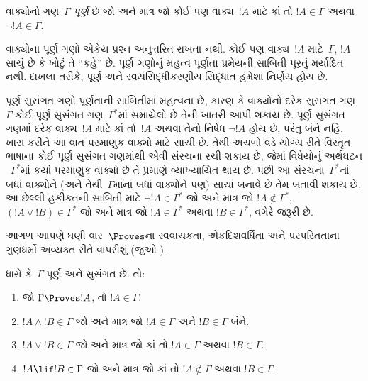 \begingroup
\makeatletter{}\makeatother


\label{guunit:OLP-0129}


\begin{defn}[પૂર્ણ ગણ]
 વાક્યોનો ગણ~$\Gamma$ \emph{પૂર્ણ}
છે જો અને માત્ર જો કોઈ પણ વાક્ય~$!A$ માટે કાં તો $!A \in
\Gamma$ અથવા $\lnot !A \in \Gamma$.
\end{defn}

\begin{explain}
વાક્યોના પૂર્ણ ગણો એકેય પ્રશ્ન અનુત્તરિત રાખતા નથી. કોઈ
પણ વાક્ય~$!A$ માટે~$\Gamma$, $!A$ સાચું છે કે ખોટું તે ``કહે''
છે. પૂર્ણ ગણોનું મહત્વ પૂર્ણતા પ્રમેયની સાબિતી પૂરતું મર્યાદિત
નથી. દાખલા તરીકે, પૂર્ણ અને સ્વયંસિદ્ધીકરણીય સિદ્ધાંત હંમેશાં
નિર્ણેય હોય છે.
\end{explain}

\begin{explain}
પૂર્ણ સુસંગત ગણો પૂર્ણતાની સાબિતીમાં મહત્વના છે, કારણ કે
વાક્યોનો દરેક સુસંગત ગણ~$\Gamma$ કોઈ પૂર્ણ સુસંગત
ગણ~$\Gamma^*$માં સમાયેલો છે તેની ખાતરી આપી શકાય છે. પૂર્ણ
સુસંગત ગણમાં દરેક વાક્ય~$!A$ માટે કાં તો~$!A$ અથવા તેનો નિષેધ
$\lnot !A$ હોય છે, પરંતુ બંને નહિ. ખાસ કરીને આ વાત
પરમાણુક વાક્યો માટે સાચી છે. તેથી
અચળો વડે યોગ્ય રીતે વિસ્તૃત ભાષાના કોઈ
પૂર્ણ સુસંગત ગણમાંથી એવી
સંરચના રચી શકાય છે, જેમાં
વિધેયોનું અર્થઘટન
~$\Gamma^*$માં કયાં પરમાણુક વાક્યો
છે તે પ્રમાણે વ્યાખ્યાયિત થાય છે. પછી આ
સંરચના~$\Gamma^*$નાં બધાં
વાક્યોને (અને તેથી~$\Gamma$માંનાં બધાં વાક્યોને પણ) સાચાં બનાવે
છે તેમ બતાવી શકાય છે. આ છેલ્લી હકીકતની સાબિતી માટે $\lnot !A \in
\Gamma^*$ જો અને માત્ર જો $!A \notin \Gamma^*$, $(!A \lor !B) \in
\Gamma^*$ જો અને માત્ર જો $!A \in \Gamma^*$ અથવા $!B \in \Gamma^*$,
વગેરે જરૂરી છે.
\end{explain}

આગળ આપણે ઘણી વાર~$\Proves$ના સ્વવાચકતા, એકદિશવર્ધિતા અને પરંપરિતતાના
ગુણધર્મો અવ્યક્ત રીતે વાપરીશું (જુઓ
%
  ).

\begin{prop}
ધારો કે~$\Gamma$ પૂર્ણ અને સુસંગત છે. તો:
\begin{enumerate}
\item {} જો $\Gamma \Proves !A$, તો $!A \in
  \Gamma$.

\item {} $!A \land !B \in \Gamma$
  જો અને માત્ર જો $!A \in \Gamma$ અને $!B \in \Gamma$ બંને.

\item {} $!A \lor !B \in \Gamma$ જો અને
  માત્ર જો કાં તો $!A \in \Gamma$ અથવા $!B \in \Gamma$.

\item {} $!A \lif !B \in \Gamma$ જો અને
  માત્ર જો કાં તો $!A \notin \Gamma$ અથવા $!B \in \Gamma$.
\end{enumerate}
\end{prop}

